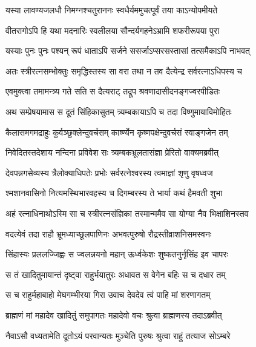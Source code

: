 \twolineshloka
{यस्या लावण्यजलधौ निमग्नश्चतुराननः}
{स्वधैर्यममुचत्पूर्वं तया काऽन्योपमीयते} %

\twolineshloka
{वीतरागोऽपि हि यथा मदनारिः स्वलीलया}
{सौन्दर्यगहनेऽभ्रामि शफरीरूपया पुरा} %

\twolineshloka
{यस्याः पुनः पुनः पश्यन् रूपं धाताऽपि सर्जने}
{ससर्जाऽप्सरसस्तासां तत्समैकाऽपि नाभवत्} %

\twolineshloka
{अतः स्त्रीरत्नसम्भोक्तुः समृद्धिस्तस्य सा वरा}
{तथा न तव दैत्येन्द्र सर्वरत्नाऽधिपस्य च} %

\twolineshloka
{एवमुक्त्वा तमामन्त्र्य गते सति स दैत्यराट्}
{तद्रूप श्रवणादासीदनङ्गज्वरपीडितः} %

\twolineshloka
{अथ सम्प्रेषयामास स दूतं सिंहिकासुतम्}
{त्र्यम्बकायाऽपि च तदा विष्णुमायाविमोहितः} %

\twolineshloka
{कैलासमगमद्राहुः कुर्वञ्छुक्लेन्दुवर्चसम्}
{कार्ष्ण्येन कृष्णपक्षेन्दुवर्चसं स्वाङ्गजेन तम्} %

\twolineshloka
{निवेदितस्तदेशाय नन्दिना प्रविवेश सः}
{त्र्यम्बकभ्रूलतासंज्ञा प्रेरितो वाक्यमब्रवीत्} %


\twolineshloka
{देवपन्नगसेव्यस्य त्रैलोक्याधिपतेः प्रभोः}
{सर्वरत्नेश्वरस्य त्वमाज्ञां शृणु वृषध्वज} %

\twolineshloka
{श्मशानवासिनो नित्यमस्थिभारवहस्य च}
{दिगम्बरस्य ते भार्या कथं हैमवती शुभा} %

\twolineshloka
{अहं रत्नाधिनाथोऽस्मि सा च स्त्रीरत्नसंज्ञिका}
{तस्मान्ममैव सा योग्या नैव भिक्षाशिनस्तव} %


\twolineshloka
{वदत्येवं तदा राहौ भ्रूमध्याच्छूलपाणिनः}
{अभवत्पुरुषो रौद्रस्तीव्राशनिसमस्वनः} %

\twolineshloka
{सिंहास्यः प्रललज्जिह्वः स ज्वलन्नयनो महान्}
{ऊर्ध्वकेशः शुष्कतनुर्नृसिंह इव चापरः} %

\twolineshloka
{स तं खादितुमायान्तं दृष्ट्वा राहुर्भयातुरः}
{अधावत स वेगेन बहिः स च दधार तम्} %

\twolineshloka
{स च राहुर्महाबाहो मेघगम्भीरया गिरा}
{उवाच देवदेव त्वं पाहि मां शरणागतम्} %

\twolineshloka
{ब्राह्मणं मां महादेव खादितुं समुपागतः}
{महादेवो वचः श्रुत्वा ब्राह्मणस्य तदाऽब्रवीत्} %

\twolineshloka
{नैवाऽसौ वध्यतामेति दूतोऽयं परवान्यतः}
{मुञ्चेति पुरुषः श्रुत्वा राहुं तत्याज सोऽम्बरे} %




